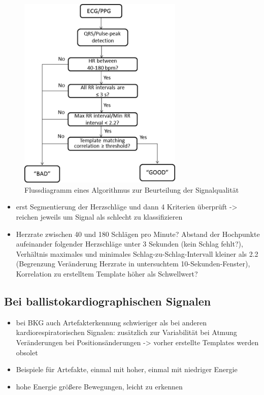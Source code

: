 	\begin{figure}[H]
		\centering
		\includegraphics[width=0.7\textwidth]{pic/ad_flussdiagramm}
		\caption[Flussdiagramm eines Algorithmus zur Beurteilung der Signalqualität]{Flussdiagramm eines Algorithmus zur Beurteilung der Signalqualität\protect\footnotemark}
		\label{fig:ecg-ad}
	\end{figure}
	
	
	\begin{itemize}
		\item erst Segmentierung der Herzschläge und dann 4 Kriterien überprüft -> reichen jeweils um Signal als schlecht zu klassifizieren
		\item Herzrate zwischen 40 und 180 Schlägen pro Minute? Abstand der Hochpunkte aufeinander folgender Herzschläge unter 3 Sekunden (kein Schlag fehlt?), Verhältnis maximales und minimales Schlag-zu-Schlag-Intervall kleiner als 2.2 (Begrenzung Veränderung Herzrate in untersuchtem 10-Sekunden-Fenster), Korrelation zu erstelltem Template höher als Schwellwert?
	\end{itemize}
	
	\subsection{Bei ballistokardiographischen Signalen}
	
	\begin{itemize}
		\item bei \ac{BKG} auch Artefakterkennung schwieriger als bei anderen kardiorespiratorischen Signalen: zusätzlich zur Variabilität bei Atmung Veränderungen bei Positionsänderungen -> vorher erstellte Templates werden obsolet
		\item Beispiele für Artefakte, einmal mit hoher, einmal mit niedriger Energie
		\item hohe Energie größere Bewegungen, leicht zu erkennen
	\end{itemize}
	

